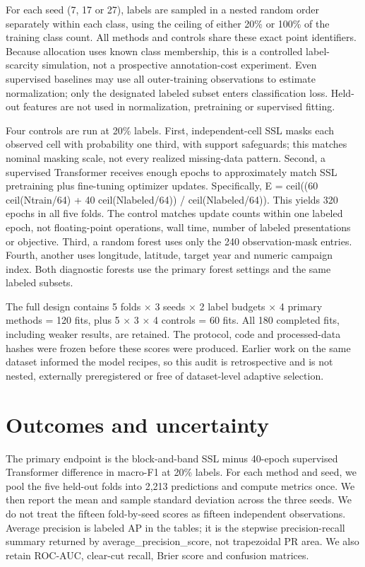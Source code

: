 \documentclass[11pt,a4paper]{article}
\begin{document}
For each seed (7, 17 or 27), labels are sampled in a nested random order separately within each class, using the ceiling of either 20\% or 100\% of the training class count. All methods and controls share these exact point identifiers. Because allocation uses known class membership, this is a controlled label-scarcity simulation, not a prospective annotation-cost experiment. Even supervised baselines may use all outer-training observations to estimate normalization; only the designated labeled subset enters classification loss. Held-out features are not used in normalization, pretraining or supervised fitting.

Four controls are run at 20\% labels. First, independent-cell SSL masks each observed cell with probability one third, with support safeguards; this matches nominal masking scale, not every realized missing-data pattern. Second, a supervised Transformer receives enough epochs to approximately match SSL pretraining plus fine-tuning optimizer updates. Specifically, E = ceil((60 ceil(Ntrain/64) + 40 ceil(Nlabeled/64)) / ceil(Nlabeled/64)). This yields 320 epochs in all five folds. The control matches update counts within one labeled epoch, not floating-point operations, wall time, number of labeled presentations or objective. Third, a random forest uses only the 240 observation-mask entries. Fourth, another uses longitude, latitude, target year and numeric campaign index. Both diagnostic forests use the primary forest settings and the same labeled subsets.

The full design contains 5 folds $\times$ 3 seeds $\times$ 2 label budgets $\times$ 4 primary methods = 120 fits, plus 5 $\times$ 3 $\times$ 4 controls = 60 fits. All 180 completed fits, including weaker results, are retained. The protocol, code and processed-data hashes were frozen before these scores were produced. Earlier work on the same dataset informed the model recipes, so this audit is retrospective and is not nested, externally preregistered or free of dataset-level adaptive selection.

\section{Outcomes and uncertainty}
The primary endpoint is the block-and-band SSL minus 40-epoch supervised Transformer difference in macro-F1 at 20\% labels. For each method and seed, we pool the five held-out folds into 2,213 predictions and compute metrics once. We then report the mean and sample standard deviation across the three seeds. We do not treat the fifteen fold-by-seed scores as fifteen independent observations. Average precision is labeled AP in the tables; it is the stepwise precision-recall summary returned by average\_precision\_score, not trapezoidal PR area. We also retain ROC-AUC, clear-cut recall, Brier score and confusion matrices.
\end{document}
